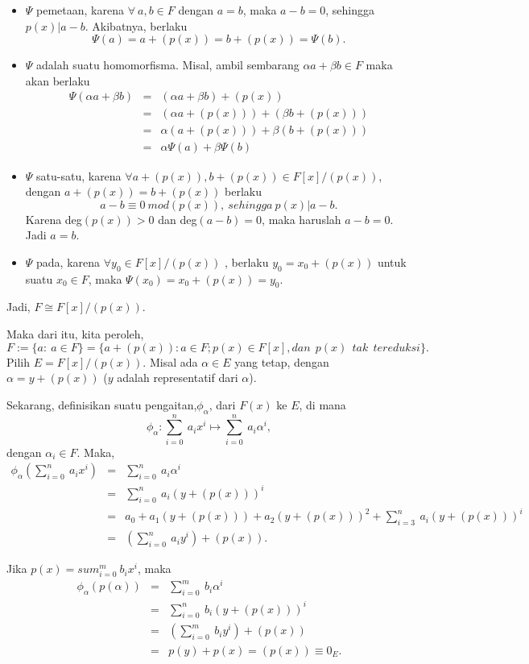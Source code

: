 		\begin{itemize}
		\item $\Psi$ pemetaan, karena $\forall~ a,b \in F$ dengan $a=b$, maka $a-b=0$, sehingga $p(x)|a-b$. Akibatnya,  berlaku $$\Psi(a) = a + (p(x)) = b + (p(x)) =\Psi(b).$$
		\item $\Psi$ adalah suatu homomorfisma. Misal, ambil sembarang $\alpha a + \beta b \in F$ maka akan berlaku
		$$\begin{array}{rcl}
		\Psi (\alpha a + \beta b) &=& (\alpha a + \beta b) + (p(x))\\
		&=& (\alpha a +(p(x))) + (\beta b +(p(x)))\\
		&=& \alpha(a+(p(x))) +\beta (b+(p(x)))\\
		&=& \alpha \Psi(a) + \beta \Psi(b)
		\end{array}$$
		\item $\Psi$ satu-satu, karena $\forall a+(p(x)),b+(p(x)) \in F[x]/(p(x))$, dengan $a+(p(x)) = b+(p(x))$ berlaku\\ 
		$$a-b \equiv 0~mod(p(x)), ~sehingga~p(x)|a-b.$$ Karena deg$(p(x)) >0$ dan deg$(a-b) =0$, maka haruslah $a-b = 0$. Jadi $a=b$.
		\item $\Psi$ pada, karena $\forall y_0\in  F[x]/(p(x))$ , berlaku $y_0=x_0+(p(x))$ untuk suatu $x_0\in F$, maka $\Psi(x_0)=x_0+(p(x))=y_0.$
		\end{itemize}
	Jadi, $F\cong F[x]/(p(x)).$
\par 	Maka dari itu, kita peroleh, $$F:=\{a:~a\in F\} = \{a+(p(x)): a \in F; p(x) \in F[x], dan~~p(x)~~tak~~tereduksi\}.$$
	Pilih $E=F[x]/(p(x))$. Misal ada $\alpha \in E$ yang tetap, dengan $\alpha = y+(p(x))$ ($y$ adalah representatif dari $\alpha$).
\par 	Sekarang, definisikan suatu pengaitan,$\phi_{\alpha}$, dari $F(x)$ ke $E$, di mana $$\phi_{\alpha}: \sum^{n}_{i=0} \ a_ix^i \mapsto \sum^{n}_{i=0} \ a_i\alpha^i,$$
	dengan $\alpha_i \in F$. Maka, 
	$$\begin{array}{rcl}
	\phi_{\alpha}( \sum^{n}_{i=0} \ a_ix^i) &=& \sum^{n}_{i=0} \ a_i\alpha^i\\
	&=& \sum^{n}_{i=0} \ a_i(y+(p(x)))^i\\
	&=& a_0+a_1(y+(p(x))) + a_2(y+(p(x)))^2+ \sum^{n}_{i=3} \ a_i(y+(p(x)))^i\\ 
	&=& (\sum^{n}_{i=0} \ a_iy^i) + (p(x)).
	\end{array}$$
\par 	Jika $p(x) = sum^{m}_{i=0} \ b_ix^i$, maka
	$$\begin{array}{rcl}
	\phi_{\alpha}(p(\alpha)) &=& \sum^{m}_{i=0} \ b_i{\alpha}^i\\
	&=& \sum^{n}_{i=0} \ b_i(y+(p(x)))^i\\
	&=& (\sum^{m}_{i=0} \ b_iy^i) + (p(x))\\
	&=& p(y)+p(x) =(p(x)) \equiv 0_E.
	\end{array}$$
